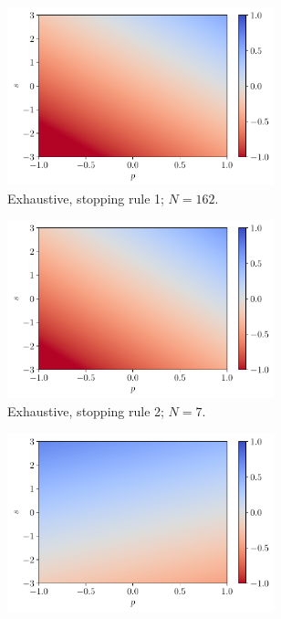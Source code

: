 \documentclass[a4paper, 12pt]{article}
\begin{document}
    \begin{figure}[H]
        \centering
        \begin{subfigure}{0.49\textwidth}
            \centering
            \includegraphics[width=0.85\textwidth]{resources/pdf/4_exhaustive_1_LR_q_+4.pdf}
            \caption{Exhaustive, stopping rule 1; $N = 162$.}
            \vspace{0.5em}
        \end{subfigure}
        \hfill
        \begin{subfigure}{0.49\textwidth}
            \centering
            \includegraphics[width=0.85\textwidth]{resources/pdf/4_exhaustive_2_LR_q_+4.pdf}
            \caption{Exhaustive, stopping rule 2; $N = 7$.}
            \vspace{0.5em}
        \end{subfigure}
        \begin{subfigure}{0.49\textwidth}
            \centering
            \includegraphics[width=0.85\textwidth]{resources/pdf/4_montecarlo_1_LR_q_+4.pdf}

\end{subfigure}
\end{figure}
\end{document}
